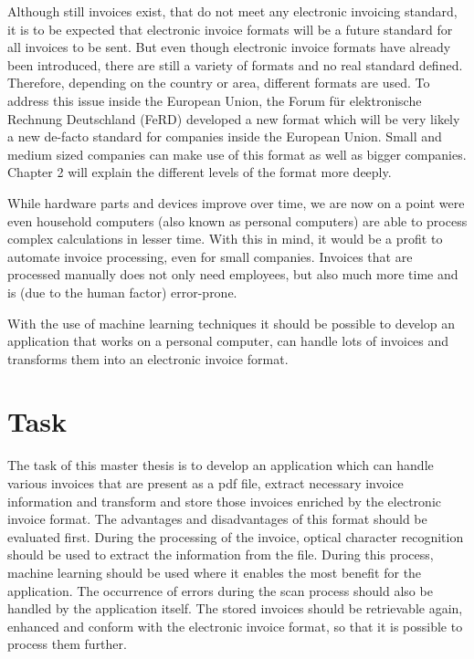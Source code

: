 Although still invoices exist, that do not meet any electronic invoicing standard, it is to be expected that electronic invoice formats will be a future standard for all invoices to be sent. But even though electronic invoice formats have already been introduced, there are still a variety of formats and no real standard defined. Therefore, depending on the country or area, different formats are used. To address this issue inside the European Union, the Forum für elektronische Rechnung Deutschland (FeRD) developed a new format which will be very likely a new de-facto standard for companies inside the European Union. Small and medium sized companies can make use of this format as well as bigger companies. Chapter 2 will explain the different levels of the format more deeply.

While hardware parts and devices improve over time, we are now on a point were even household computers (also known as personal computers) are able to process complex calculations in lesser time. With this in mind, it would be a profit to automate invoice processing, even for small companies. Invoices that are processed manually does not only need employees, but also much more time and is (due to the human factor) error-prone. 

With the use of machine learning techniques it should be possible to develop an application that works on a personal computer, can handle lots of invoices and transforms them into an electronic invoice format.

\section{Task}

The task of this master thesis is to develop an application which can handle various invoices that are present as a pdf file, extract necessary invoice information and transform and store those invoices enriched by the electronic invoice format. The advantages and disadvantages of this format should be evaluated first.
During the processing of the invoice, optical character recognition should be used to extract the information from the file. During this process, machine learning should be used where it enables the most benefit for the application.
The occurrence of errors during the scan process should also be handled by the application itself.
The stored invoices should be retrievable again, enhanced and conform with the electronic invoice format, so that it is possible to process them further.

